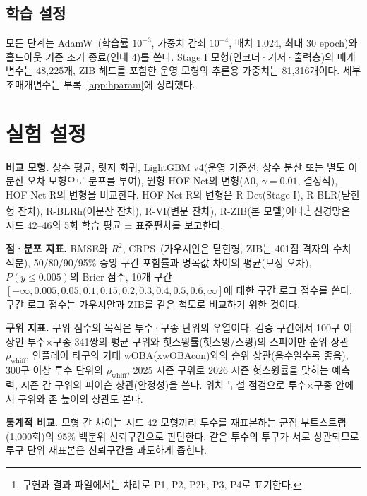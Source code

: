 \documentclass[journal,a4paper,10pt]{IEEEtran}
\begin{document}
\subsection{학습 설정}
모든 단계는 AdamW~\cite{loshchilov2019decoupled}(학습률 $10^{-3}$, 가중치 감쇠 $10^{-4}$, 배치 1,024, 최대 30 epoch)와 홀드아웃 기준 조기 종료(인내 4)를 쓴다. Stage I 모형(인코더·기저·출력층)의 매개변수는 48,225개, ZIB 헤드를 포함한 운영 모형의 추론용 가중치는 81,316개이다. 세부 초매개변수는 부록~\ref{app:hparam}에 정리했다.

\section{실험 설정}
\label{sec:setup}

\textbf{비교 모형.} 상수 평균, 릿지 회귀, LightGBM v4(운영 기준선; 상수 분산 또는 별도 이분산 오차 모형으로 분포를 부여), 원형 HOF-Net의 변형(A0, $\gamma=0.01$, 결정적), HOF-Net-R의 변형을 비교한다. HOF-Net-R의 변형은 R-Det(Stage I), R-BLR(닫힌형 잔차), R-BLRh(이분산 잔차), R-VI(변분 잔차), R-ZIB(본 모델)이다.\footnote{구현과 결과 파일에서는 차례로 P1, P2, P2h, P3, P4로 표기한다.} 신경망은 시드 42–46의 5회 학습 평균 ± 표준편차를 보고한다.

\textbf{점·분포 지표.} RMSE와 $R^2$, CRPS~\cite{gneiting2007strictly}(가우시안은 닫힌형, ZIB는 401점 격자의 수치 적분), 50/80/90/95\% 중앙 구간 포함률과 명목값 차이의 평균(보정 오차), $P(y\le0.005)$의 Brier 점수, 10개 구간 $[-\infty,0.005,0.05,0.1,0.15,0.2,0.3,0.4,0.5,0.6,\infty]$에 대한 구간 로그 점수를 쓴다. 구간 로그 점수는 가우시안과 ZIB를 같은 척도로 비교하기 위한 것이다.

\textbf{구위 지표.} 구위 점수의 목적은 투수·구종 단위의 우열이다. 검증 구간에서 100구 이상인 투수×구종 341쌍의 평균 구위와 헛스윙률(헛스윙/스윙)의 스피어만 순위 상관 $\rho_{\mathrm{whiff}}$, 인플레이 타구의 기대 wOBA(xwOBAcon)와의 순위 상관(음수일수록 좋음), 300구 이상 투수 단위의 $\rho_{\mathrm{whiff}}$, 2025 시즌 구위로 2026 시즌 헛스윙률을 맞히는 예측력, 시즌 간 구위의 피어슨 상관(안정성)을 쓴다. 위치 누설 점검으로 투수×구종 안에서 구위와 존 높이의 상관도 본다.

\textbf{통계적 비교.} 모형 간 차이는 시드 42 모형끼리 투수를 재표본하는 군집 부트스트랩(1,000회)의 95\% 백분위 신뢰구간으로 판단한다. 같은 투수의 투구가 서로 상관되므로 투구 단위 재표본은 신뢰구간을 과도하게 좁힌다.

\end{document}
